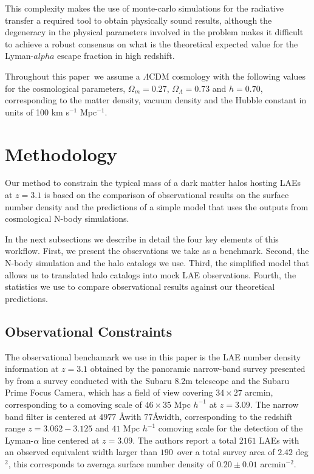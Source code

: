 \documentclass[usenatbib]{mn2e}
\newcommand{\documentname}{paper~}
\begin{document}
This complexity makes the use of monte-carlo simulations for the
radiative transfer a required tool to obtain physically sound results,
although the degeneracy in the physical parameters involved in the
problem makes it difficult to achieve a robust consensus on what is
the theoretical expected value for the Lyman-$alpha$ escape fraction
in high redshift. 


Throughout this \documentname we assume a $\Lambda$CDM cosmology with the
following values for the cosmological parameters, $\Omega_{m}=0.27$,
$\Omega_{\Lambda}=0.73$ and $h=0.70$, corresponding to the matter
density, vacuum density and the Hubble constant in units of 100 km
s$^{-1}$ Mpc$^{-1}$. 

\section{Methodology}

Our method to constrain the typical mass of a dark matter halos
hosting LAEs at $z=3.1$ is based on the comparison of observational
results on the surface number density and the predictions of a simple
model that uses the outputs from cosmological N-body simulations. 

In the next subsections we describe in detail the four key elements of
this workflow. First, we present the observations we take as a
benchmark. Second, the N-body simulation and the halo catalogs we
use. Third, the simplified model that allows us to translated halo
catalogs into mock LAE observations. Fourth, the statistics we use to
compare observational results against our theoretical predictions.

\subsection{Observational Constraints}

The observational benchamark we use in this paper is the LAE number
density information at $z=3.1$ obtained by the panoramic narrow-band
survey presented by \cite{Yamada2012} from a survey  conducted with
the Subaru 8.2m telescope and the Subaru Prime Focus Camera, which has
a field of view covering $34\times 27$ arcmin, corresponding to a
comoving scale of $46\times35$ Mpc $h^{-1}$ at $z=3.09$. The narrow
band filter is centered at $4977$ \AA with  $77$\AA width,
corresponding to the redshift range $z=3.062-3.125$ and $41$ Mpc
$h^{-1}$ comoving scale for the detection of the Lyman-$\alpha$ line
centered at $z=3.09$. The authors report a total  $2161$ LAEs with an
observed equivalent width larger than $190$\ over a total survey area
of $2.42$ deg$^{2}$, this corresponds to  averaga surface number
density of $0.20\pm 0.01$ arcmin$^{-2}$.   
\end{document}
